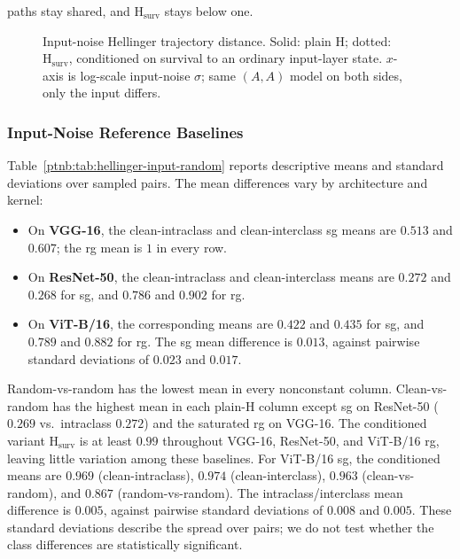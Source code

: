 paths stay shared, and $\mathrm H_{\mathrm{surv}}$ stays below one.

\begin{figure}[H]
    \centering
    
    \caption[Input-noise Hellinger trajectory distance]{Input-noise Hellinger trajectory distance. Solid: plain $\mathrm{H}$; dotted:
    $\mathrm{H}_{\mathrm{surv}}$, conditioned on survival to an ordinary input-layer state. $x$-axis is
    log-scale input-noise $\sigma$; same $(A,A)$ model on both sides, only the input differs.}
    \label{ptnb:fig:hellinger-input-noise}
\end{figure}

\subsubsection{Input-Noise Reference Baselines}\label{ptnb:sec:input-noise-baselines}

Table~\ref{ptnb:tab:hellinger-input-random} reports descriptive means and standard deviations over sampled pairs. The mean differences vary by architecture and kernel:
\begin{itemize}
    \item On \textbf{VGG-16}, the clean-intraclass and clean-interclass \ac{sg} means are $0.513$ and $0.607$; the \ac{rg} mean is $1$ in every row.
    \item On \textbf{ResNet-50}, the clean-intraclass and clean-interclass means are $0.272$ and $0.268$ for \ac{sg}, and $0.786$ and $0.902$ for \ac{rg}.
    \item On \textbf{ViT-B/16}, the corresponding means are $0.422$ and $0.435$ for \ac{sg}, and $0.789$ and $0.882$ for \ac{rg}. The \ac{sg} mean difference is $0.013$, against pairwise standard deviations of $0.023$ and $0.017$.
\end{itemize}
Random-vs-random has the lowest mean in every nonconstant column. Clean-vs-random has the highest mean in each plain-$\mathrm{H}$ column except \ac{sg} on ResNet-50 ($0.269$ vs.\ intraclass $0.272$) and the saturated \ac{rg} on VGG-16. The conditioned variant $\mathrm{H}_{\mathrm{surv}}$ is at least $0.99$ throughout VGG-16, ResNet-50, and ViT-B/16 \ac{rg}, leaving little variation among these baselines. For ViT-B/16 \ac{sg}, the conditioned means are $0.969$ (clean-intraclass), $0.974$ (clean-interclass), $0.963$ (clean-vs-random), and $0.867$ (random-vs-random). The intraclass/interclass mean difference is $0.005$, against pairwise standard deviations of $0.008$ and $0.005$. These standard deviations describe the spread over pairs; we do not test whether the class differences are statistically significant.

